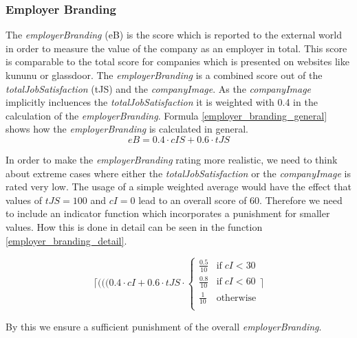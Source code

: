 \subsubsection{Employer Branding}\label{employer_branding}


The \textit{employerBranding} (\gls{eB}) is the score which is reported to the external world in order to measure the value of the company as an employer in total. This score is comparable to the total score for companies which is presented on websites like kununu or glassdoor. The \textit{employerBranding} is a combined score out of the \textit{totalJobSatisfaction} (\gls{tJS}) and the \textit{companyImage}. As the \textit{companyImage} implicitly incluences the \textit{totalJobSatisfaction} it is weighted with 0.4 in the calculation of the \textit{employerBranding}. Formula \ref{employer_branding_general} shows how the \textit{employerBranding} is calculated in general.
\begin{equation}
    eB = 0.4 \cdot cIS + 0.6 \cdot tJS
    \label{employer_branding_general}
\end{equation}

In order to make the \textit{employerBranding} rating more realistic, we need to think about extreme cases where either the \textit{totalJobSatisfaction} or the \textit{companyImage} is rated very low. The usage of a simple weighted average would have the effect that values of $tJS = 100$ and $cI = 0$ lead to an overall score of 60.
Therefore we need to include an indicator function which incorporates a punishment for smaller values. How this is done in detail can be seen in the function \ref{employer_branding_detail}.

\begin{equation}
    \lceil (((0.4 \cdot cI + 0.6 \cdot tJS \cdot 
        \begin{cases}
             \frac{0.5}{10} & \text{if} \; cI < 30\\
             \frac{0.8}{10} & \text{if} \; cI < 60\\
             \frac{1}{10} & \text{otherwise} \\
        \end{cases}
    \rceil
    \label{employer_branding_detail}
\end{equation}

By this we ensure a sufficient punishment of the overall \textit{employerBranding}. 

